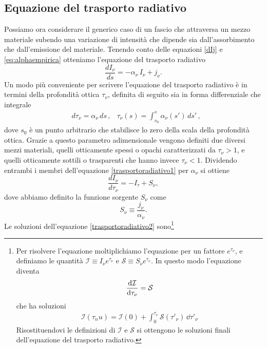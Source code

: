\subsection{Equazione del trasporto radiativo}
Possiamo ora considerare il generico caso di un fascio che attraversa un mezzo materiale subendo una variazione di intensità che dipende sia dall'assorbimento che dall'emissione del materiale. Tenendo conto delle equazioni \ref{dIj} e \ref{eq:alphaempirica} otteniamo l'equazione del trasporto radiativo
\begin{equation}
\frac{dI_{\nu}}{ds}=-\alpha_{\nu}\,I_{\nu}+j_{\nu}. 
\label{trasportoradiativo1}
\end{equation}
Un modo più conveniente per scrivere l'equazione del trasporto radiativo è in termini della profondità ottica $\tau_{\nu}$, definita di seguito sia in forma differenziale che integrale
\begin{align}
&d\tau_{\nu}=\alpha_{\nu}\,ds\, ,
&\tau_{\nu}(s)={\int_{s_{0}}^s}\alpha_{\nu}(s')\,ds'\, ,
\label{eq:profonditàottica}
\end{align}
dove $s_{0}$ è un punto arbitrario che stabilisce lo zero della scala della profondità ottica. Grazie a questo  parametro adimensionale vengono definiti due diversi mezzi materiali, quelli otticamente spessi o opachi caratterizzati da $\tau_{\nu}>1$, e quelli otticamente sottili o trasparenti che hanno invece  $\tau_{\nu}<1$. Dividendo entrambi i membri dell'equazione \ref{trasportoradiativo1} per $\alpha_{\nu}$ si ottiene
\begin{equation}
\frac{dI_{\nu}}{d\tau_{\nu}}=-I_{\tau}+S_{\nu},
\label{trasportoradiativo2}
\end{equation} 
dove abbiamo definito la funzione sorgente $S_{\nu}$ come
\begin{equation}
S_{\nu}\equiv\frac{j_{\nu}}{\alpha_{\nu}}.
\end{equation}
Le soluzioni dell'equazione \ref{trasportoradiativo2} sono\footnote{
Per risolvere l'equazione moltiplichiamo l'equazione per un fattore $e^{\tau_\nu}$, e definiamo le quantità $\mathcal{I} \equiv I_\nu e^{\tau_\nu}$ e $\mathcal{S} \equiv S_\nu e^{\tau_\nu}$. In questo modo l'equazione diventa 
\begin{align*}
\dfrac{\mathrm{d} {\mathcal{I}}}{\mathrm{d} {\tau_\nu}} = \mathcal{S}
\end{align*}
che ha soluzioni
\begin{align*}
\mathcal{I}(\tau_nu) = \mathcal{I}(0) + \int_0^{\tau_\nu}\mathcal{S}(\tau'_\nu )\, \dd \tau'_\nu
\end{align*}
Risostituendovi le definizioni di $\mathcal{I}$ e $\mathcal{S}$ si ottengono le soluzioni finali dell'equazione del trasporto radiativo.}
